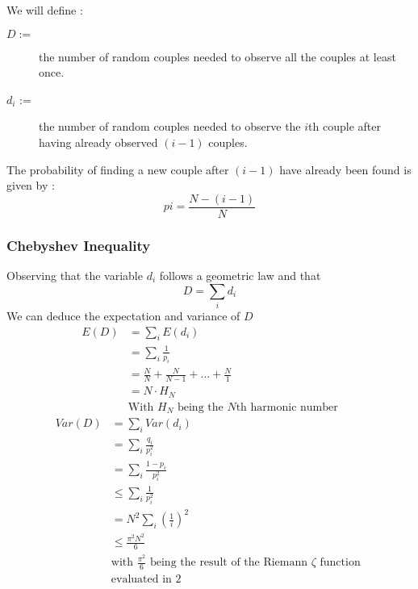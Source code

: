 We will define :
\begin{description}
\item[$D :=$] the number of random couples needed to observe all the couples at least once.
\item[$d_i$ := ] the number of random couples needed to observe the $i$th couple after having already observed $(i-1)$ couples.
\end{description}

The probability of finding a new couple after $(i-1)$ have already been found is given by :
\begin{equation}
    \label{eqn:pti}
    pi = \frac{N - (i-1)}{N}
\end{equation}

\subsubsection{Chebyshev Inequality}
Observing that the variable $d_i$ follows a geometric law and that 
\begin{equation}
    D=\sum_i d_i
\end{equation}
We can deduce the expectation and variance of $D$
\begin{equation}
    \label{eqn:expectationD}
    \begin{split}
    E(D) & = \sum_i E(d_i) \\
    & = \sum_i \frac{1}{p_i} \\ 
    & = \frac{N}{N} +\frac{N}{N-1}+\dots+\frac{N}{1} \\
    & = N\cdot H_N \\
    & \text{With $H_N$ being the $N$th harmonic number}
\end{split}
\end{equation}
\begin{equation}
    \label{eqn:varD}
    \begin{split}
    Var(D) & = \sum_i Var(d_i) \\
    & = \sum_i \frac{q_i}{p_i^2} \\
    & = \sum_i \frac{1-p_i}{p_i^2}\\
    & \le \sum_i \frac{1}{p_i^2}\\
    & = N^2 \sum_i \left( \frac{1}{i}\right) ^2\\
    & \le \frac{\pi ^2N^2}{6}\\
    & \text{with $\frac{\pi^2}{6}$ being the result of the Riemann $\zeta$ function } \\ 
    & \text{evaluated in $2$}
    \end{split}
\end{equation}

